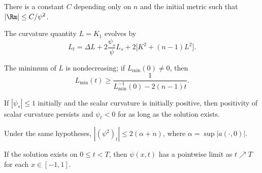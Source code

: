\begin{corollary}
\label{ch02-cor-neckpinch-curvature-radius}

There is a constant \(C\) depending only on \(n\) and the initial metric such
that \(|\Rm|\le C/\psi^2\).
\end{corollary}

\begin{lemma}
\label{ch02-lem-neckpinch-L-evolution}

The curvature quantity \(L=K_1\) evolves by
\[
L_t=\Delta L+2\frac{\psi_s}{\psi}L_s+2\bigl[K^2+(n-1)L^2\bigr].
\]
\end{lemma}

\begin{corollary}
\label{ch02-cor-neckpinch-Lmin}

The minimum of \(L\) is nondecreasing; if \(L_{\min}(0)\neq 0\), then
\[
L_{\min}(t)\ge \frac{1}{L_{\min}^{-1}(0)-2(n-1)t}.
\]
\end{corollary}

\begin{lemma}
\label{ch02-lem-neckpinch-shrinking-radius}

If \(|\psi_s|\le 1\) initially and the scalar curvature is initially positive,
then positivity of scalar curvature persists and \(\psi_t<0\) for as long as
the solution exists.
\end{lemma}

\begin{lemma}
\label{ch02-lem-neckpinch-lipschitz}

Under the same hypotheses, \(|(\psi^2)_t|\le 2(\alpha+n)\), where
\(\alpha=\sup|a(\cdot,0)|\).
\end{lemma}

\begin{corollary}
\label{ch02-cor-neckpinch-limit-profile}

If the solution exists on \(0\le t<T\), then \(\psi(x,t)\) has a pointwise
limit as \(t\nearrow T\) for each \(x\in[-1,1]\).
\end{corollary}

